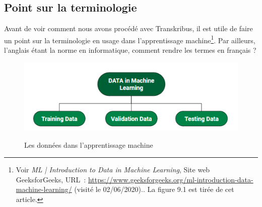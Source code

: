 \subsection{Point sur la terminologie}

Avant de voir comment nous avons procédé avec Transkribus, il est utile de faire un point sur la terminologie en usage dans l'apprentissage machine\footnote{Voir \emph{ML | Introduction to Data in Machine Learning}, Site web GeeksforGeeks, URL~: \url{https://www.geeksforgeeks.org/ml-introduction-data-machine-learning/} (visité le 02/06/2020).. La figure 9.1 est tirée de cet article.}. Par ailleurs, l'anglais étant la norme en informatique, comment rendre les termes en français ? 

\begin{figure}[ht]
    \centering
    \caption{Les données dans l'apprentissage machine}
    \includegraphics[width=16cm]{images/terminologieML.png}
    \label{terminologieML}
\end{figure}

